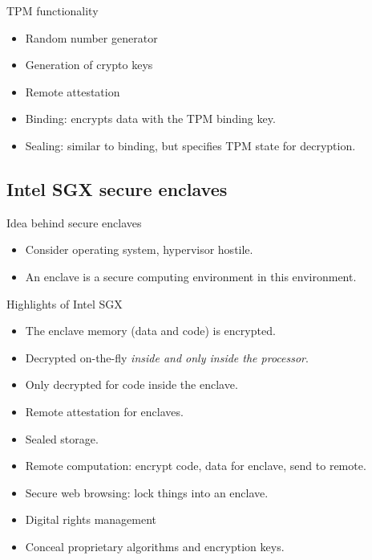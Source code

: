\begin{frame}
  \begin{block}{TPM functionality}
    \begin{itemize}
      \item Random number generator
      \item Generation of crypto keys
      \item Remote attestation
      \item Binding: encrypts data with the TPM binding key.
      \item Sealing: similar to binding, but specifies TPM state for 
        decryption.
    \end{itemize}
  \end{block}
\end{frame}

\subsection{Intel SGX secure enclaves}

\begin{frame}
  \begin{block}{Idea behind secure enclaves}
    \begin{itemize}
      \item Consider operating system, hypervisor hostile.
      \item An enclave is a secure computing environment in this environment.
    \end{itemize}
  \end{block}
\end{frame}

\begin{frame}
  \begin{block}{Highlights of Intel SGX}
    \begin{itemize}
      \item The enclave memory (data and code) is encrypted.
      \item Decrypted on-the-fly \emph{inside and only inside the processor}.
      \item Only decrypted for code inside the enclave.
      \item Remote attestation for enclaves.
      \item Sealed storage.
    \end{itemize}
  \end{block}
\end{frame}

\begin{frame}
  \begin{example}[Uses]
    \begin{itemize}
      \item Remote computation: encrypt code, data for enclave, send to remote.
      \item Secure web browsing: lock things into an enclave.
      \item Digital rights management
      \item Conceal proprietary algorithms and encryption keys.
    \end{itemize}
  \end{example}
\end{frame}

